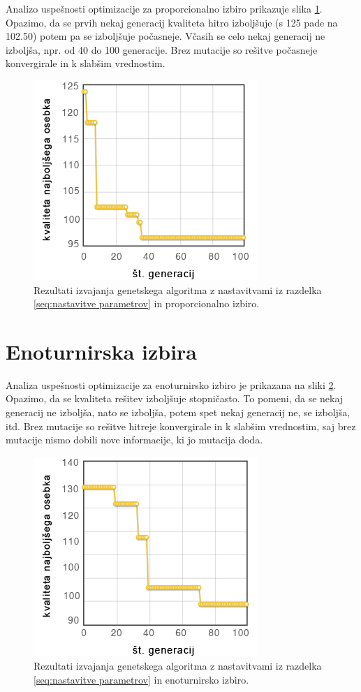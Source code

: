 \documentclass[a4paper, 12pt]{book}
\begin{document}
Analizo uspe\v snosti optimizacije za proporcionalno izbiro prikazuje slika \ref{res:proporcionalna izbira}. Opazimo, da se prvih nekaj generacij kvaliteta hitro izbolj\v suje (s 125 pade na 102.50) potem pa se izbolj\v suje po\v casneje. V\v casih se celo nekaj generacij ne izbolj\v sa, npr. od 40 do 100 generacije. Brez mutacije so re\v sitve po\v casneje konvergirale in k slab\v sim vrednostim.

\begin{figure}
\centering
\includegraphics[scale=0.70]{prop_izbira.png}
\caption{Rezultati izvajanja genetskega algoritma z nastavitvami iz razdelka \ref{seq:nastavitve parametrov} in proporcionalno izbiro.}
\label{res:proporcionalna izbira}
\end{figure}

\section{Enoturnirska izbira}

Analiza uspe\v snosti optimizacije za enoturnirsko izbiro je prikazana na sliki \ref{fig1}. Opazimo, da se kvaliteta re\v sitev izbolj\v suje stopni\v casto. To pomeni, da se nekaj generacij ne izbolj\v sa, nato se izbolj\v sa, potem spet nekaj generacij ne, se izbolj\v sa, itd. Brez mutacije so re\v sitve hitreje konvergirale in k slab\v sim vrednostim, saj brez mutacije nismo dobili nove informacije, ki jo mutacija doda.
\begin{figure}
\centering
\includegraphics[scale=0.70]{enotur_izbira.png}
\caption{Rezultati izvajanja genetskega algoritma z nastavitvami iz razdelka \ref{seq:nastavitve parametrov} in enoturnirsko izbiro.}
\label{fig1}
\end{figure}
\end{document}
